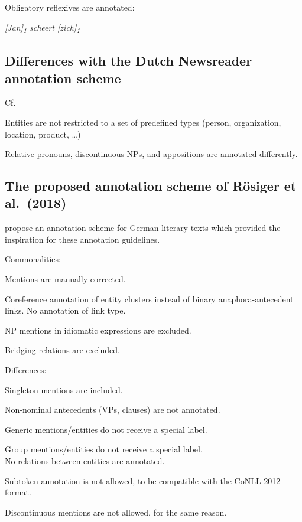 \begin{itemize*}
\begin{itemize*}
    \end{itemize*}

\item Obligatory reflexives are annotated:

    \emph{{[}Jan{]}\textsubscript{1} scheert
  {[}zich{]}\textsubscript{1}}

\end{itemize*}


\subsection{Differences with the Dutch Newsreader annotation scheme}
Cf. \citet{schoen2014newsreader}
\begin{itemize*}
\item Entities are not restricted to a set of predefined types
    (person, organization, location, product, \dots)
\item Relative pronouns, discontinuous NPs, and appositions are annotated
  differently.
\end{itemize*}

\subsection{The proposed annotation scheme of R\"osiger et al.~(2018)}
\citet{roesiger2018literary} propose an annotation scheme for German literary texts
which provided the inspiration for these annotation guidelines.

Commonalities:
\begin{itemize*}
\item Mentions are manually corrected.
\item Coreference annotation of entity clusters
    instead of binary anaphora-antecedent links.
    No annotation of link type.
\item NP mentions in idiomatic expressions are excluded.
\item Bridging relations are excluded.
\end{itemize*}

\filbreak
Differences:
\begin{itemize*}
\item Singleton mentions are included.
\item Non-nominal antecedents (VPs, clauses) are not annotated.
\item Generic mentions/entities do not receive a special label.
\item Group mentions/entities do not receive a special label.\\
    No relations between entities are annotated.
\item Subtoken annotation is not allowed, to be compatible with the CoNLL 2012 format.
\item Discontinuous mentions are not allowed, for the same reason.
\end{itemize*}




